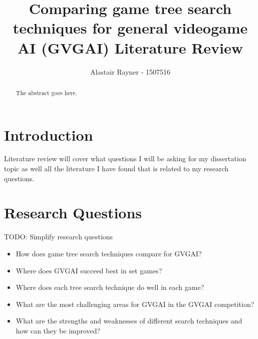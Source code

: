 \documentclass[journal]{IEEEtran}
\begin{document}
%
\title{Comparing game tree search techniques for general videogame AI (GVGAI) Literature Review}
%
%
\author{Alastair Rayner - 1507516}


\maketitle

\begin{abstract}
The abstract goes here.
\end{abstract}

\section{Introduction}
 Literature review will cover what questions I will be asking for my dissertation topic as well all the literature I have found that is related to my research questions.




\section{Research Questions}

TODO: Simplify research questions
\begin{itemize}
    \item How does game tree search techniques compare for GVGAI?
    \item Where does GVGAI succeed best in set games?
    \item Where does each tree search technique do well in each game?
    \item What are the most challenging areas for GVGAI in the GVGAI competition?
    \item What are the strengths and weaknesses of different search techniques and how can they be improved?
\end{itemize}
\end{document}
